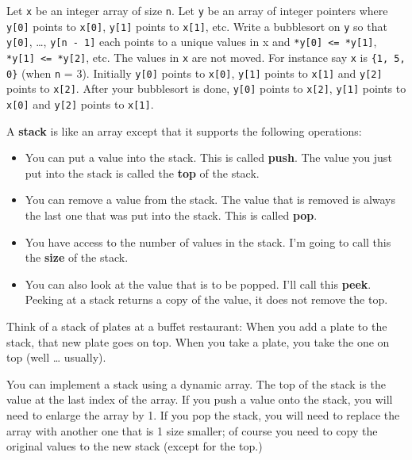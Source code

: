 \begin{ex}
Let \texttt{x} be an integer array of size \texttt{n}.
Let \texttt{y} be an array of integer pointers where \texttt{y[0]}
points to \texttt{x[0]}, \texttt{y[1]} points to \texttt{x[1]},
etc. Write a bubblesort on \texttt{y} so that \texttt{y[0]}, \ldots,
\texttt{y[n - 1]} each points to a unique values in x and
\texttt{*y[0] <= *y[1]}, \texttt{*y[1] <= *y[2]}, etc. The values in \texttt{x} are not moved. For instance say
\texttt{x} is \texttt{\{1, 5, 0\}} (when \texttt{n} = 3). Initially
\texttt{y[0]} points to \texttt{x[0]}, \texttt{y[1]} points to
\texttt{x[1]} and \texttt{y[2]} points to \texttt{x[2]}. After
your bubblesort is done, \texttt{y[0]} points to \texttt{x[2]},
\texttt{y[1]} points to \texttt{x[0]} and \texttt{y[2]} points to
\texttt{x[1]}.
\end{ex}

\newpage{}

A \textbf{stack} is like an array except that it supports the following
operations:

\begin{itemize}
\item
  You can put a value into the stack. This is called \textbf{push}. The
  value you just put into the stack is called the \textbf{top} of the
  stack.
\item
  You can remove a value from the stack. The value that is removed is
  always the last one that was put into the stack. This is called
  \textbf{pop}.
\item
  You have access to the number of values in the stack. I'm going to
  call this the \textbf{size} of the stack.
\item
  You can also look at the value that is to be popped. I'll call this
  \textbf{peek}. Peeking at a stack returns a copy of the value, it does
  not remove the top.
\end{itemize}

Think of a stack of plates at a buffet restaurant: When you add a plate
to the stack, that new plate goes on top. When you take a plate, you
take the one on top (well \ldots{} usually).

You can implement a stack using a dynamic array. The top of the stack is
the value at the last index of the array. If you push a value onto the
stack, you will need to enlarge the array by 1. If you pop the stack,
you will need to replace the array with another one that is 1 size
smaller; of course you need to copy the original values to the new stack
(except for the top.)

